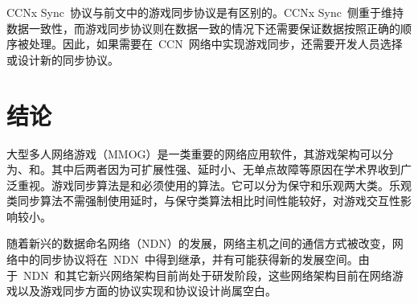 CCNx Sync~协议与前文中的游戏同步协议是有区别的。CCNx Sync~侧重于维持数据一致性，而游戏同步协议则在数据一致的情况下还需要保证数据按照正确的顺序被处理。因此，如果需要在~CCN~网络中实现游戏同步，还需要开发人员选择或设计新的同步协议。



\section{结论}

大型多人网络游戏（MMOG）是一类重要的网络应用软件，其游戏架构可以分为{\csa}、{\pa}和{\da}。其中后两者因为可扩展性强、延时小、无单点故障等原因在学术界收到广泛重视。游戏同步算法是{\pa}和{\da}必须使用的算法。它可以分为保守和乐观两大类。乐观类同步算法不需强制使用延时，与保守类算法相比时间性能较好，对游戏交互性影响较小。

随着新兴的数据命名网络（NDN）的发展，网络主机之间的通信方式被改变，网络中的同步协议将在~NDN~中得到继承，并有可能获得新的发展空间。由于~NDN~和其它新兴网络架构目前尚处于研发阶段，这些网络架构目前在网络游戏以及游戏同步方面的协议实现和协议设计尚属空白。








